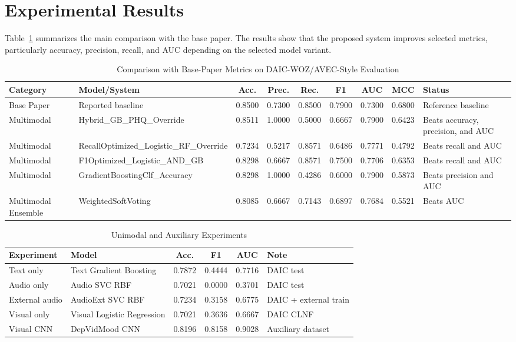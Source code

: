 \documentclass[conference]{IEEEtran}
\begin{document}
\section{Experimental Results}
Table~\ref{tab:base-comparison} summarizes the main comparison with the base paper. The results show that the proposed system improves selected metrics, particularly accuracy, precision, recall, and AUC depending on the selected model variant.

\begin{table}[htbp]
\caption{Comparison with Base-Paper Metrics on DAIC-WOZ/AVEC-Style Evaluation}
\label{tab:base-comparison}
\centering
\scriptsize
\setlength{\tabcolsep}{3pt}
\begin{tabular}{p{2.0cm}p{3.8cm}ccccccp{3.6cm}}
\toprule
\textbf{Category} & \textbf{Model/System} & \textbf{Acc.} & \textbf{Prec.} & \textbf{Rec.} & \textbf{F1} & \textbf{AUC} & \textbf{MCC} & \textbf{Status} \\
\midrule
Base Paper & Reported baseline & 0.8500 & 0.7300 & 0.8500 & 0.7900 & 0.7300 & 0.6800 & Reference baseline \\
Multimodal & Hybrid\_GB\_PHQ\_Override & 0.8511 & 1.0000 & 0.5000 & 0.6667 & 0.7900 & 0.6423 & Beats accuracy, precision, and AUC \\
Multimodal & RecallOptimized\_Logistic\_RF\_Override & 0.7234 & 0.5217 & 0.8571 & 0.6486 & 0.7771 & 0.4792 & Beats recall and AUC \\
Multimodal & F1Optimized\_Logistic\_AND\_GB & 0.8298 & 0.6667 & 0.8571 & 0.7500 & 0.7706 & 0.6353 & Beats recall and AUC \\
Multimodal & GradientBoostingClf\_Accuracy & 0.8298 & 1.0000 & 0.4286 & 0.6000 & 0.7900 & 0.5873 & Beats precision and AUC \\
Multimodal Ensemble & WeightedSoftVoting & 0.8085 & 0.6667 & 0.7143 & 0.6897 & 0.7684 & 0.5521 & Beats AUC \\
\bottomrule
\end{tabular}
\end{table}

\begin{table}[htbp]
\caption{Unimodal and Auxiliary Experiments}
\label{tab:unimodal}
\centering
\scriptsize
\setlength{\tabcolsep}{3pt}
\begin{tabular}{p{1.35cm}p{1.85cm}cccp{1.35cm}}
\toprule
\textbf{Experiment} & \textbf{Model} & \textbf{Acc.} & \textbf{F1} & \textbf{AUC} & \textbf{Note} \\
\midrule
Text only & Text Gradient Boosting & 0.7872 & 0.4444 & 0.7716 & DAIC test \\
Audio only & Audio SVC RBF & 0.7021 & 0.0000 & 0.3701 & DAIC test \\
External audio & AudioExt SVC RBF & 0.7234 & 0.3158 & 0.6775 & DAIC + external train \\
Visual only & Visual Logistic Regression & 0.7021 & 0.3636 & 0.6667 & DAIC CLNF \\
Visual CNN & DepVidMood CNN & 0.8196 & 0.8158 & 0.9028 & Auxiliary dataset \\
\bottomrule
\end{tabular}
\end{table}
\end{document}
